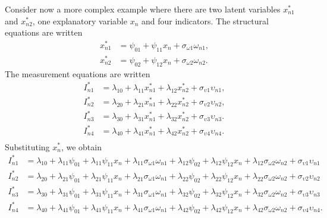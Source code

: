 \documentclass[12pt,a4paper]{article}
\begin{document}
Consider now a more complex example where there are two latent variables $x^*_{n1}$ and $x^*_{n2}$, one explanatory variable $x_n$ and four indicators. The structural equations  are written
\[
\begin{aligned}
x^*_{n1} &=  \psi_{01} + \psi_{11} x_{n} + \sigma_{\omega 1} \omega_{n1}, \\
x^*_{n2} &= \psi_{02} + \psi_{12} x_{n} + \sigma_{\omega 2} \omega_{n2}.
\end{aligned}
\]
The measurement equations  are written
\[
\begin{aligned}
I^*_{n1} &= \lambda_{10} +\lambda_{11}  x_{n1}^* + \lambda_{12}  x_{n2}^* + \sigma_{\upsilon 1} \upsilon_{n1}, \\
I^*_{n2} &= \lambda_{20} +\lambda_{21}  x_{n1}^* + \lambda_{22}  x_{n2}^* + \sigma_{\upsilon 2} \upsilon_{n2}, \\
I^*_{n3} &= \lambda_{30} +\lambda_{31}  x_{n1}^* + \lambda_{32}  x_{n2}^* + \sigma_{\upsilon 3} \upsilon_{n3}. \\
I^*_{n4} &= \lambda_{40} +\lambda_{41}  x_{n1}^* + \lambda_{42}  x_{n2}^* + \sigma_{\upsilon 4} \upsilon_{n4}. \\
\end{aligned}
\]
Substituting $x^*_{n}$, we obtain
\[
\begin{aligned}
  I^*_{n1} &=  \lambda_{10} +\lambda_{11}  \psi_{01} + \lambda_{11}\psi_{11} x_{n} + \lambda_{11}\sigma_{\omega 1} \omega_{n1} + \lambda_{12}  \psi_{02} + \lambda_{12}\psi_{12} x_{n} + \lambda_{12}\sigma_{\omega 2} \omega_{n2} + \sigma_{\upsilon 1} \upsilon_{n1}\\
  I^*_{n2} &=   \lambda_{20} +\lambda_{21}  \psi_{01} + \lambda_{21}\psi_{11} x_{n} + \lambda_{21}\sigma_{\omega 1} \omega_{n1} + \lambda_{22}  \psi_{02} + \lambda_{22}\psi_{12} x_{n} + \lambda_{22}\sigma_{\omega 2} \omega_{n2} + \sigma_{\upsilon 2} \upsilon_{n2}\\
  I^*_{n3} &=   \lambda_{30} +\lambda_{31}  \psi_{01} + \lambda_{31}\psi_{11} x_{n} + \lambda_{31}\sigma_{\omega 1} \omega_{n1} + \lambda_{32}  \psi_{02} + \lambda_{32}\psi_{12} x_{n} + \lambda_{32}\sigma_{\omega 2} \omega_{n2} + \sigma_{\upsilon 3} \upsilon_{n3}\\
  I^*_{n4} &=   \lambda_{40} +\lambda_{41}  \psi_{01} + \lambda_{41}\psi_{11} x_{n} + \lambda_{41}\sigma_{\omega 1} \omega_{n1} + \lambda_{42}  \psi_{02} + \lambda_{42}\psi_{12} x_{n} + \lambda_{42}\sigma_{\omega 2} \omega_{n2} + \sigma_{\upsilon 4} \upsilon_{n4}.\\
\end{aligned}
\]
\end{document}
